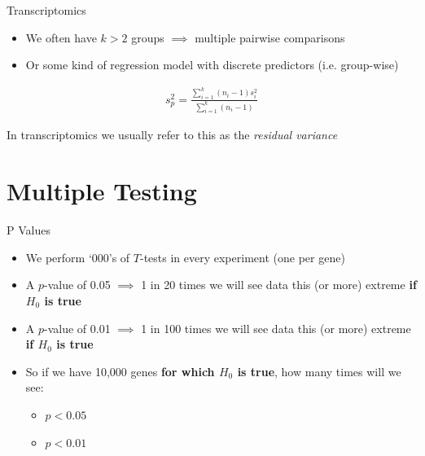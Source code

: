 \documentclass[aspectratio=169,11pt]{beamer}
\begin{document}
\begin{frame}{Transcriptomics}

	\begin{itemize}
		\item We often have $k > 2$ groups $\implies$ multiple pairwise comparisons	
		\item Or some kind of regression model with discrete predictors (i.e. group-wise) 
	\end{itemize}
	
	\begin{align*}
		s_p^2 = \frac{\sum_{i=1}^k(n_i -1)s_i^2}{\sum_{i=1}^k(n_i -1)}
	\end{align*}
	
	In transcriptomics we usually refer to this as the \textit{residual variance}

\end{frame}

\section{Multiple Testing}

\begin{frame}{P Values}

	\begin{itemize}
		\item We perform `000's of $T$-tests in every experiment (one per gene)
		\item A $p$-value of 0.05 $\implies$ 1 in 20 times we will see data this (or more) extreme \textbf{if $H_0$ is true}
		\item A $p$-value of 0.01 $\implies$ 1 in 100 times we will see data this (or more) extreme \textbf{if $H_0$ is true}
		\item So if we have 10,000 genes \textbf{for which $H_0$ is true}, how many times will we see:
		\begin{itemize}
			\item $p < 0.05$
			\item $p < 0.01$
		\end{itemize}
	\end{itemize}

\end{frame}
\end{document}
